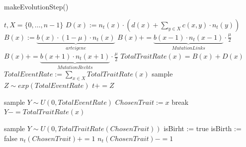\documentclass[11pt, a4paper, german]{article}
\theoremstyle{plain}
\begin{document}
	\begin{algorithm}[H]
		\caption{makeEvolutionStep()}
		\begin{algorithmic}[1]
			\Require $ t, X = \{0,\dots, n-1\} $
			\Comment{$ \downarrow $ \textcolor[rgb]{0,0,0.55}{calculateEventRates}() $ \downarrow $}
				\State $  D(x) := n_t(x) \cdot \left( d(x) + \sum_{y \in X} c(x,y) \cdot n_t(y) \right) $
				\State $ B(x) := \underbrace{b(x) \cdot (1 - \mu) \cdot n_t(x)}_{arteigene}  $
					\State $ B(x) += \underbrace{b(x-1)\cdot n_t(x-1)}_{Mutation Links} \cdot \frac{\mu}{2} $
				\EndIf
					\State $ B(x) += \underbrace{b(x+1)\cdot n_t(x+1)}_{Mutation Rechts} \cdot \frac{\mu}{2} $
				\EndIf
				\State $ TotalTraitRate(x) = B(x) + D(x) $
			\EndFor
			\State $ TotalEventRate := \sum_{x \in X} TotalTraitRate(x) $
			\State sample $ Z \sim exp(TotalEventRate) $ \Comment{$\downarrow $ \textcolor[rgb]{0,0,0.55}{sampleEventTime}() $ \downarrow $} 
			\State $ t += Z $
			
			\State sample $ Y \sim U(0,TotalEventRate) $ \Comment{$ \downarrow $ \textcolor[rgb]{0,0,0.55}{choseTraitToChange}() $ \downarrow $}
					\State $ ChosenTrait := x $
					\State break
				\EndIf
				\State $ Y -= TotalTraitRate(x) $
			\EndFor 
			
			\State sample $ Y \sim U(0,TotalTraitRate(ChosenTrait)) $
			 \Comment{$ \downarrow $ \textcolor[rgb]{0,0,0.55}{choseEventType()} $ \downarrow $}
				\State isBirht := true
			\Else
				\State isBirth := false
			\EndIf
			 \Comment{$ \downarrow $
				\textcolor[rgb]{0,0,0.55}{executeEventTypeOnTrait()} $ \downarrow $}
				\State $ n_t(ChosenTrait) += 1 $
			\Else
					\State $ n_t(ChosenTrait) -= 1 $
				\EndIf
			\EndIf
		\end{algorithmic}
	\end{algorithm}
	
\end{document}
